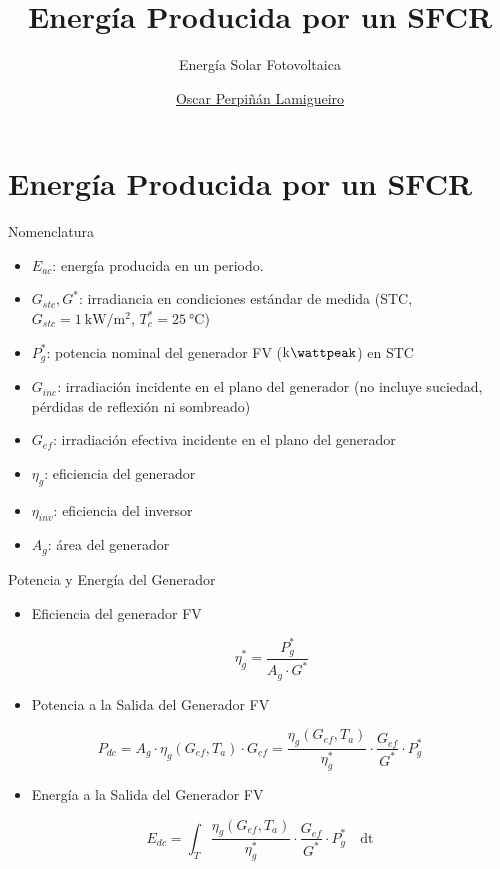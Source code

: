 \documentclass[aspectratio=169, usenames,svgnames,dvipsnames]{beamer}
\author{\href{https://oscarperpinan.github.io}{Oscar Perpiñán Lamigueiro}}
\date{}
\title{Energía Producida por un SFCR}
\subtitle{Energía Solar Fotovoltaica}
\institute[UPM]{Universidad Politécnica de Madrid}
\begin{document}
\maketitle

\section{Energía Producida por un SFCR}
\label{sec:org1d75121}

\begin{frame}[label={sec:orgc3bb6f9}]{Nomenclatura}
\begin{itemize}
\item \(E_{ac}\): energía producida en un periodo.
\item \(G_{stc}, G^*\): irradiancia en condiciones estándar de medida (STC,
\(G_{stc}=\SI{1}{\kilo\watt\per\meter\squared}\),
\(T^*_c=\SI{25}{\celsius}\))
\item \(P_{g}^{*}\): potencia nominal del generador FV
(\(\si{\kilo\wattpeak}\)) en STC
\item \(G_{inc}\): irradiación incidente en el plano del
generador (no incluye suciedad, pérdidas de reflexión ni sombreado)
\item \(G_{ef}\): irradiación efectiva incidente en el plano del
generador
\item \(\eta_g\): eficiencia del generador
\item \(\eta_{inv}\): eficiencia del inversor
\item \(A_g\): área del generador
\end{itemize}
\end{frame}

\begin{frame}[label={sec:org5fc7897}]{Potencia y Energía del Generador}
\begin{itemize}
\item \alert{Eficiencia} del generador FV

\[
  \eta_g^* = \dfrac{P_g^*}{A_g \cdot G^*}
\]
\item \alert{Potencia} a la Salida del Generador FV
\end{itemize}
\[
  P_{dc} = A_g \cdot \eta_g(G_{ef}, T_a) \cdot  G_{ef} = %
  \frac{\eta_g(G_{ef}, T_a)}{\eta_g^*} \cdot \frac{G_{ef}}{G^*} \cdot P_g^*
\]

\begin{itemize}
\item \alert{Energía} a la Salida del Generador FV
\end{itemize}

\[
  E_{dc} = \int_T \frac{\eta_g(G_{ef}, T_a)}{\eta_g^*} \cdot
  \frac{G_{ef}}{G^*} \cdot P_g^*\quad \mathrm{dt}
\]
\end{frame}
\end{document}
